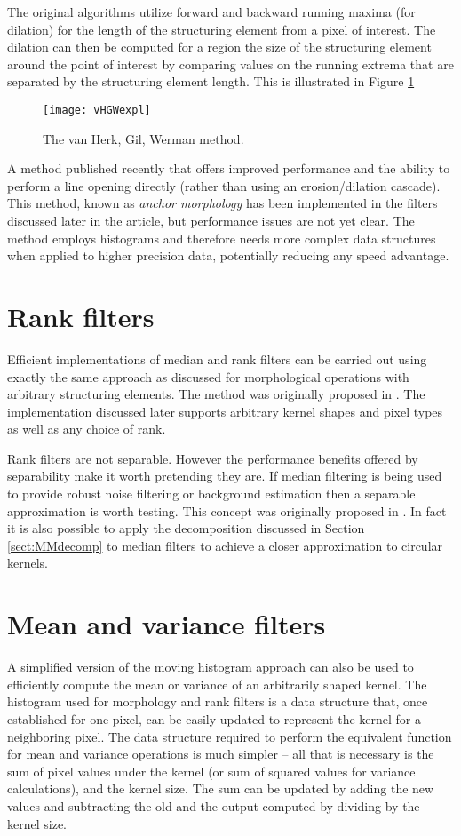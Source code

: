 \documentclass{InsightArticle}
\begin{document}
The original algorithms utilize forward and backward running maxima
(for dilation) for the length of the structuring element from a pixel
of interest. The dilation can then be computed for a region the size
of the structuring element around the point of interest by comparing
values on the running extrema that are separated by the structuring
element length. This is illustrated in Figure \ref{fig:vHGWmethod}

\begin{figure}[htbp]
\centering
\texttt{[image: vHGWexpl]}
\caption{The van Herk, Gil, Werman method.\label{fig:vHGWmethod}}
\end{figure}

A method published recently that offers improved performance
\cite{Vandroogenbroeck2005Morphological} and the ability to perform a
line opening directly (rather than using an erosion/dilation
cascade). This method, known as {\em anchor morphology} has been
implemented in the filters discussed later in the article, but
performance issues are not yet clear. The method employs histograms
and therefore needs more complex data structures when applied to
higher precision data, potentially reducing any speed advantage.

\section{Rank filters}
\label{sect:rank}
Efficient implementations of median and rank filters can be carried out
using exactly the same approach as discussed for morphological
operations with arbitrary structuring elements. The method was
originally proposed in \cite{Huang79}. The implementation discussed
later supports arbitrary kernel shapes and pixel types as well as any
choice of rank.

Rank filters are not separable. However the performance benefits
offered by separability make it worth pretending they are. If median
filtering is being used to provide robust noise filtering or
background estimation then a separable approximation is worth
testing. This concept was originally proposed in \cite{Narendra81}. In
fact it is also possible to apply the decomposition discussed in
Section \ref{sect:MMdecomp} to median filters to achieve a closer
approximation to circular kernels.

\section{Mean and variance filters}
\label{sect:meanVar}
A simplified version of the moving histogram approach can also be used
to efficiently compute the mean or variance of an arbitrarily shaped
kernel. The histogram used for morphology and rank filters is a data
structure that, once established for one pixel, can be easily updated
to represent the kernel for a neighboring pixel. The data structure
required to perform the equivalent function for mean and variance
operations is much simpler -- all that is necessary is the sum of
pixel values under the kernel (or sum of squared values for variance
calculations), and the kernel size. The sum can be updated by adding
the new values and subtracting the old and the output computed by
dividing by the kernel size.
\end{document}

